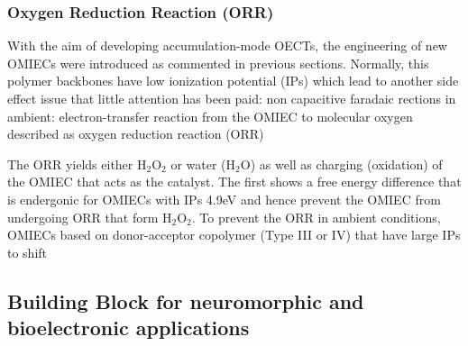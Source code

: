 \subsubsection{Oxygen Reduction Reaction (ORR)}

With the aim of developing accumulation-mode OECTs, the engineering of new OMIECs were introduced as commented in previous sections. Normally, this polymer backbones have low ionization potential (IPs) which lead to another side effect issue that little attention has been paid: non capacitive faradaic rections in ambient: electron-transfer reaction from the OMIEC to molecular oxygen described as oxygen reduction reaction (ORR)


The ORR yields either H$_{2}$O$_{2}$ or water (H$_{2}$O) as well as charging (oxidation) of the OMIEC that acts as the catalyst. The first shows a free energy difference that is endergonic for OMIECs with IPs \> 4.9eV and hence prevent the OMIEC from undergoing ORR that form H$_{2}$O$_{2}$. To prevent the ORR in ambient conditions, OMIECs based on donor-acceptor copolymer (Type III or IV) that have large IPs to shift
\cite{giovannittiEnergeticControlRedoxActive2020}

\subsection{Building Block for neuromorphic and bioelectronic applications}



